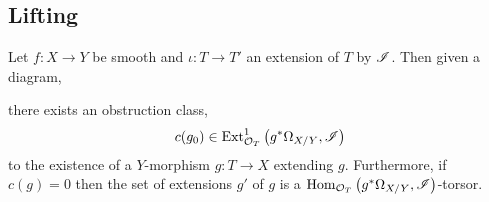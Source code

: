 \documentclass[12pt]{article}
\begin{document}
\subsection{Lifting}

\begin{prop}
Let $f : X \to Y$ be smooth and $\iota : T \to T'$ an extension of $T$ by $\mathscr{I}$. Then given a diagram,
\begin{center}
\end{center}
there exists an obstruction class,
\[ c(g_0) \in \mathrm{Ext}^{1}_{\mathcal{O}_{T}} \left( g^* \Omega_{X/Y}, \mathscr{I} \right) \]
to the existence of a $Y$-morphism $g : T \to X$ extending $g$. Furthermore, if $c(g) = 0$ then the set of extensions $g'$ of $g$ is a $\mathrm{Hom}_{\mathcal{O}_{T}} \left( g^* \Omega_{X/Y}, \mathscr{I} \right)$-torsor.
\end{prop}
\end{document}
